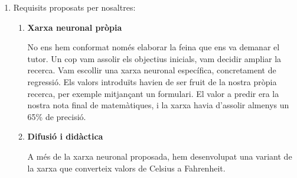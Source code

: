 \begin{enumerate}
    \item Requisits proposats per nosaltres:

    \begin{enumerate}

        \item \textbf{Xarxa neuronal pròpia}

        No ens hem conformat només elaborar la feina que ens va demanar el tutor. Un cop vam assolir els objectius inicials, vam decidir ampliar la recerca. Vam escollir una xarxa neuronal específica, concretament de regressió. Els valors introduïts havien de ser fruit de la nostra pròpia recerca, per exemple mitjançant un formulari. El valor a predir era la nostra nota final de matemàtiques, i la xarxa havia d’assolir almenys un 65\% de precisió.

        \item \textbf{Difusió i didàctica}

      A més de la xarxa neuronal proposada, hem desenvolupat una variant de la xarxa que converteix valors de Celsius a Fahrenheit.

    \end{enumerate}

\end{enumerate}

%
